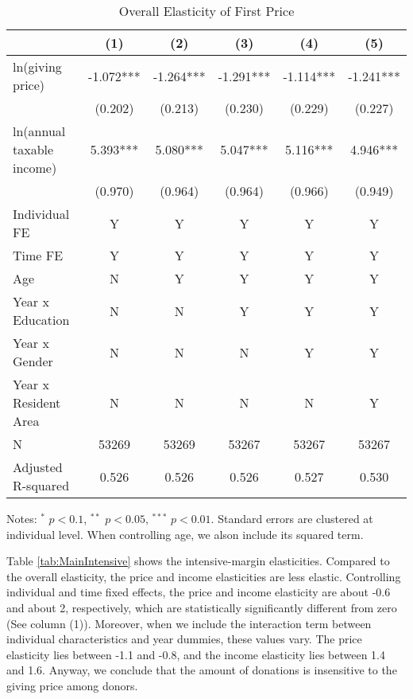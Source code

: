 \documentclass[
  11pt,
  a4paper,
]{article}
\begin{document}
\begin{table}

\caption{\label{tab:MainOverall}Overall Elasticity of First Price}
\centering
\fontsize{7}{9}\selectfont
\begin{threeparttable}
\begin{tabular}[t]{lccccc}
\toprule
 & (1) & (2) & (3) & (4) & (5)\\
\midrule
ln(giving price) & -1.072*** & -1.264*** & -1.291*** & -1.114*** & -1.241***\\
 & (0.202) & (0.213) & (0.230) & (0.229) & (0.227)\\
ln(annual taxable income) & 5.393*** & 5.080*** & 5.047*** & 5.116*** & 4.946***\\
 & (0.970) & (0.964) & (0.964) & (0.966) & (0.949)\\
Individual FE & Y & Y & Y & Y & Y\\
Time FE & Y & Y & Y & Y & Y\\
Age & N & Y & Y & Y & Y\\
Year x Education & N & N & Y & Y & Y\\
Year x Gender & N & N & N & Y & Y\\
Year x Resident Area & N & N & N & N & Y\\
N & 53269 & 53269 & 53267 & 53267 & 53267\\
Adjusted R-squared & 0.526 & 0.526 & 0.526 & 0.527 & 0.530\\
\bottomrule
\end{tabular}
\begin{tablenotes}
\item Notes: $^{*}$ $p < 0.1$, $^{**}$ $p < 0.05$, $^{***}$ $p < 0.01$. Standard errors are clustered at individual level. When controlling age, we alson include its squared term.
\end{tablenotes}
\end{threeparttable}
\end{table}

Table \ref{tab:MainIntensive} shows the intensive-margin elasticities.
Compared to the overall elasticity, the price and income elasticities are less elastic.
Controlling individual and time fixed effects,
the price and income elasticity are about -0.6 and about 2, respectively,
which are statistically significantly different from zero (See column (1)).
Moreover, when we include the interaction term between individual characteristics and year dummies,
these values vary.
The price elasticity lies between -1.1 and -0.8,
and the income elasticity lies between 1.4 and 1.6.
Anyway, we conclude that the amount of donations is insensitive to the giving price among donors.
\end{document}
